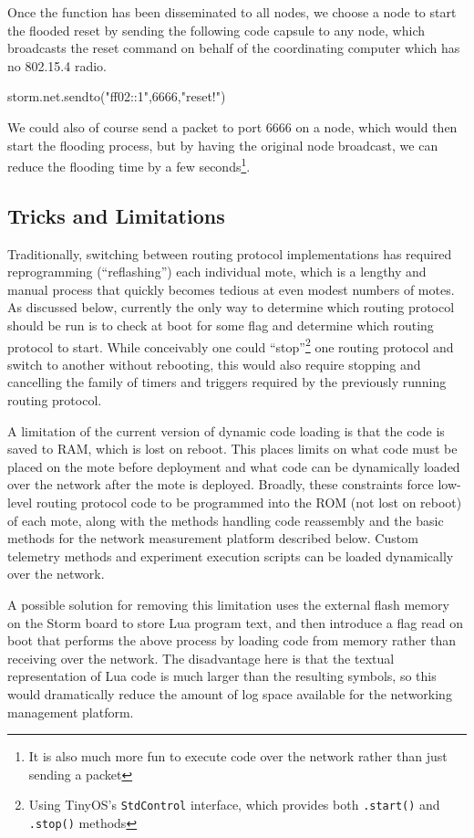 Once the function has been disseminated to all nodes, we choose a node to start the flooded reset by sending the following code capsule to any node, which broadcasts the reset command on behalf of the coordinating computer which has no 802.15.4 radio.

\begin{luacode}
storm.net.sendto("ff02::1",6666,"reset!")
\end{luacode}

We could also of course send a packet to port 6666 on a node, which would then start the flooding process, but by having the original node broadcast, we can reduce the flooding time by a few seconds\footnote{It is also much more fun to execute code over the network rather than just sending a packet}.

\subsection{Tricks and Limitations}

Traditionally, switching between routing protocol implementations has required reprogramming (``reflashing'') each individual mote, which is a lengthy and manual process that quickly becomes tedious at even modest numbers of motes.
As discussed below, currently the only way to determine which routing protocol should be run is to check at boot for some flag and determine which routing protocol to start.
While conceivably one could ``stop''\footnote{Using TinyOS's \texttt{StdControl} interface, which provides both \texttt{.start()} and \texttt{.stop()} methods} one routing protocol and switch to another without rebooting, this would also require stopping and cancelling the family of timers and triggers required by the previously running routing protocol.

A limitation of the current version of dynamic code loading is that the code is saved to RAM, which is lost on reboot.
This places limits on what code must be placed on the mote before deployment and what code can be dynamically loaded over the network after the mote is deployed.
Broadly, these constraints force low-level routing protocol code to be programmed into the ROM (not lost on reboot) of each mote, along with the methods handling code reassembly and the basic methods for the network measurement platform described below.
Custom telemetry methods and experiment execution scripts can be loaded dynamically over the network.

A possible solution for removing this limitation uses the external flash memory on the Storm board to store Lua program text, and then introduce a flag read on boot that performs the above process by loading code from memory rather than receiving over the network.
The disadvantage here is that the textual representation of Lua code is much larger than the resulting symbols, so this would dramatically reduce the amount of log space available for the networking management platform.

